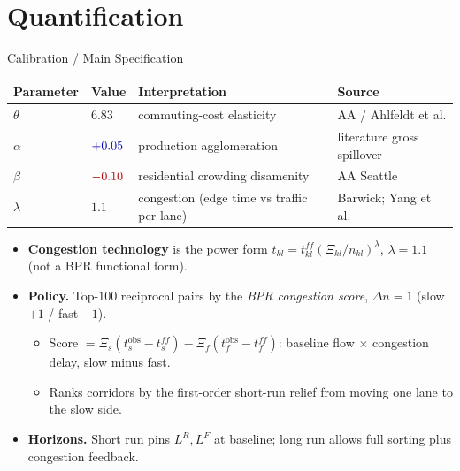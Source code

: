 \documentclass[11pt,aspectratio=169]{beamer}
\newcommand{\good}[1]{\textcolor{blue!70!black}{#1}}
\newcommand{\bad}[1]{\textcolor{red!70!black}{#1}}
\begin{document}
\section{Quantification}\label{sec:quant}
\begin{frame}{Calibration / Main Specification}
\begin{center}
\begin{tabular}{llll}
\toprule
Parameter & Value & Interpretation & Source \\
\midrule
$\theta$ & $6.83$ & commuting-cost elasticity & AA / Ahlfeldt et al. \\
$\alpha$ & $\good{+0.05}$ & production agglomeration & literature gross spillover \\
$\beta$ & $\bad{-0.10}$ & residential crowding disamenity & AA Seattle \\
$\lambda$ & $1.1$ & congestion (edge time vs traffic per lane) & Barwick; Yang et al. \\
\bottomrule
\end{tabular}
\end{center}
\vspace{0.4em}
\begin{itemize}\small
  \item \textbf{Congestion technology} is the power form $t_{kl}=t_{kl}^{ff}(\Xi_{kl}/n_{kl})^{\lambda}$, $\lambda=1.1$ (not a BPR functional form).
  \item \textbf{Policy.} Top-$100$ reciprocal pairs by the \emph{BPR congestion score}, $\Delta n=1$ (slow $+1$ / fast $-1$).
  \begin{itemize}\footnotesize
    \item Score $=\Xi_s(t_s^{\mathrm{obs}}-t_s^{ff})-\Xi_f(t_f^{\mathrm{obs}}-t_f^{ff})$: baseline flow $\times$ congestion delay, slow minus fast.
    \item Ranks corridors by the first-order short-run relief from moving one lane to the slow side.
  \end{itemize}
  \item \textbf{Horizons.} \good{Short run} pins $L^R,L^F$ at baseline; \good{long run} allows full sorting plus congestion feedback.
\end{itemize}
\end{frame}
\end{document}
